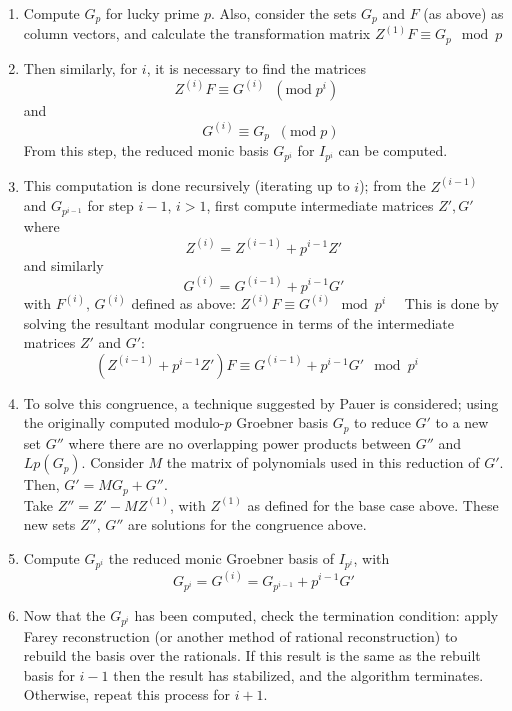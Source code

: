 \documentclass[letterpaper,12pt,titlepage,oneside,final]{book}
\begin{document}
\begin{enumerate}
  \item Compute ${G_p}$ for lucky prime ${p}$.  Also, consider the sets ${G_p}$ and ${F}$ (as above) as column vectors, and calculate the transformation matrix ${Z^{(1)}F \equiv G_p \mod p}$
  \item Then similarly, for ${i}$, it is necessary to find the matrices \begin{equation*} Z^{(i)}F \equiv G^{(i)} \;\; (\textrm{mod} \; p^i) \quad\end{equation*}and\begin{equation*}\quad G^{(i)} \equiv G_p \;\; (\textrm{mod} \; p)\end{equation*}From this step, the reduced monic basis ${G_{p^i}}$ for ${I_{p^i}}$ can be computed.
  \item This computation is done recursively (iterating up to ${i}$); from the ${Z^{(i-1)}}$ and ${G_{p^{i-1}}}$ for step ${i-1,\, i > 1}$, first compute intermediate matrices ${Z', G'}$ where
  \begin{equation*}
    Z^{(i)} = Z^{(i-1)} + p^{i-1}Z'
  \end{equation*}
  and similarly
  \begin{equation*}
    G^{(i)} = G^{(i-1)} + p^{i-1}G'
  \end{equation*}
  with ${F^{(i)},\, G^{(i)}}$ defined as above: ${Z^{(i)}F \equiv G^{(i)} \mod p^i \quad}$
  This is done by solving the resultant modular congruence in terms of the intermediate matrices ${Z'}$ and ${G'}$:
  \begin{equation*}
    (Z^{(i-1)} + p^{i-1}Z')F \equiv G^{(i-1)} + p^{i-1}G'\mod p^i \quad
  \end{equation*}
  \item To solve this congruence, a technique suggested by Pauer is considered; using the originally computed modulo-${p}$ Groebner basis ${G_p}$ to reduce ${G'}$ to a new set ${G''}$ where there are no overlapping power products between ${G''}$ and ${Lp(G_p)}$.  Consider ${M}$ the matrix of polynomials used in this reduction of ${G'}$.  Then, ${G' = MG_p + G''}$.\\ Take ${Z'' = Z' - MZ^{(1)}}$, with ${Z^{(1)}}$ as defined for the base case above.  These new sets ${Z'',\, G''}$ are solutions for the congruence above.
  \item Compute ${G_{p^i}}$ the reduced monic Groebner basis of ${I_{p^i}}$, with \begin{equation*}G_{p^i} = G^{(i)} = G_{p^{i-1}} + p^{i-1}G'\end{equation*}
  \item Now that the ${G_{p^i}}$ has been computed, check the termination condition: apply Farey reconstruction (or another method of rational reconstruction) to rebuild the basis over the rationals.  If this result is the same as the rebuilt basis for ${i-1}$ then the result has stabilized, and the algorithm terminates.  Otherwise, repeat this process for ${i+1}$.
\end{enumerate}      
\end{document}
